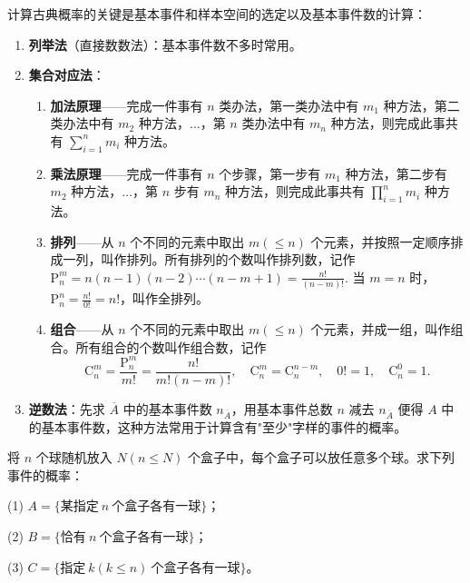 \documentclass[lang=cn,11pt]{elegantbook}
\begin{document}
\begin{note}
计算古典概率的关键是基本事件和样本空间的选定以及基本事件数的计算：
\begin{enumerate}
    \item \textbf{列举法}（直接数数法）：基本事件数不多时常用。
    \item \textbf{集合对应法}：
    \begin{enumerate}
        \item \textbf{加法原理}——完成一件事有 \(n\) 类办法，第一类办法中有 \(m_1\) 种方法，第二类办法中有 \(m_2\) 种方法，\(\dots\)，第 \(n\) 类办法中有 \(m_n\) 种方法，则完成此事共有 \(\sum_{i=1}^{n} m_i\) 种方法。
        \item \textbf{乘法原理}——完成一件事有 \(n\) 个步骤，第一步有 \(m_1\) 种方法，第二步有 \(m_2\) 种方法，\(\dots\)，第 \(n\) 步有 \(m_n\) 种方法，则完成此事共有 \(\prod_{i=1}^{n} m_i\) 种方法。
        \item \textbf{排列}——从 \(n\) 个不同的元素中取出 \(m(\le n)\) 个元素，并按照一定顺序排成一列，叫作排列。所有排列的个数叫作排列数，记作
        \(
        \mathrm{P}_n^m = n(n-1)(n-2)\cdots(n-m+1) = \frac{n!}{(n-m)!}.
        \)
        当 \(m=n\) 时，\(\mathrm{P}_n^n = \frac{n!}{0!} = n!\)，叫作全排列。
        \item \textbf{组合}——从 \(n\) 个不同的元素中取出 \(m(\le n)\) 个元素，并成一组，叫作组合。所有组合的个数叫作组合数，记作
        \[
        \mathrm{C}_n^m = \frac{\mathrm{P}_n^m}{m!} = \frac{n!}{m!(n-m)!}, \quad \mathrm{C}_n^m = \mathrm{C}_n^{n-m}, \quad 0!=1, \quad \mathrm{C}_n^0=1.
        \]
    \end{enumerate}
    \item \textbf{逆数法}：先求 \(\overline{A}\) 中的基本事件数 \(n_{\overline{A}}\)，用基本事件总数 \(n\) 减去 \(n_{\overline{A}}\) 便得 \(A\) 中的基本事件数，这种方法常用于计算含有"至少"字样的事件的概率。
\end{enumerate}
\end{note}


\begin{exercise}\label{exer:1-4}\label{exer:src-2017-a-ii-02}
将 \(n\) 个球随机放入 \(N(n\le N)\) 个盒子中，每个盒子可以放任意多个球。求下列事件的概率：\par
(1) \(A=\{\text{某指定} \ n \ \text{个盒子各有一球}\}\)；\par
(2) \(B=\{\text{恰有} \ n \ \text{个盒子各有一球}\}\)；\par
(3) \(C=\{\text{指定} \ k(k\le n) \ \text{个盒子各有一球}\}\)。
\end{exercise}
\end{document}

